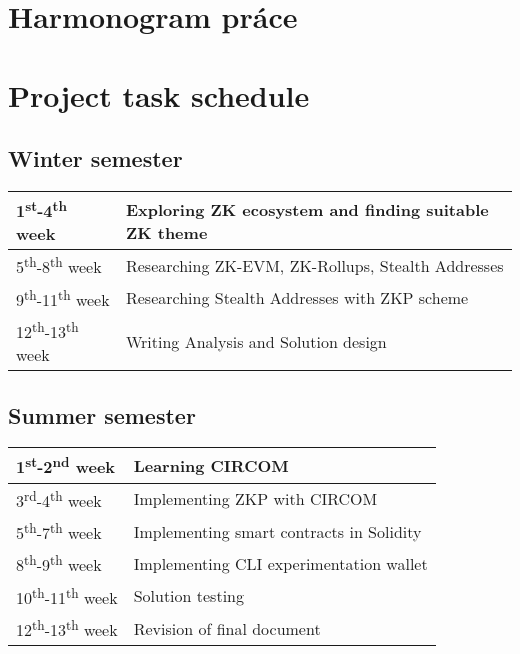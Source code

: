 \thispagestyle{empty}

\ifx\FIITlagEN\undefined
\chapter{Harmonogram práce}
\else
\chapter{Project task schedule}
\fi

\renewcommand*{\thepage}{B-\arabic{page}}

\section{Winter semester}

\begin{tabular}{|l||l|}
\hline
1\textsuperscript{st}-4\textsuperscript{th} week    & Exploring ZK ecosystem and finding suitable ZK theme \\
\hline
5\textsuperscript{th}-8\textsuperscript{th} week    & Researching ZK-EVM, ZK-Rollups, Stealth Addresses \\
\hline
9\textsuperscript{th}-11\textsuperscript{th} week   & Researching Stealth Addresses with ZKP scheme \\
\hline
12\textsuperscript{th}-13\textsuperscript{th} week  & Writing Analysis and Solution design \\
\hline
\end{tabular}

\section{Summer semester}
\begin{tabular}{|l||l|}
\hline
1\textsuperscript{st}-2\textsuperscript{nd} week    & Learning CIRCOM  \\
\hline
3\textsuperscript{rd}-4\textsuperscript{th} week    & Implementing ZKP with CIRCOM  \\
\hline
5\textsuperscript{th}-7\textsuperscript{th} week    & Implementing smart contracts in Solidity  \\
\hline
8\textsuperscript{th}-9\textsuperscript{th} week    & Implementing CLI experimentation wallet  \\
\hline
10\textsuperscript{th}-11\textsuperscript{th} week  & Solution testing  \\
\hline
12\textsuperscript{th}-13\textsuperscript{th} week  & Revision of final document  \\
\hline
\end{tabular}
